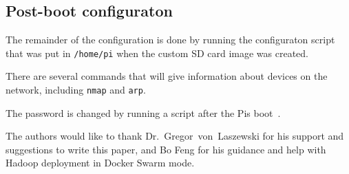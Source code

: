 \subsection{Post-boot configuraton}
The remainder of the configuration is done by running the configuraton
script that was put in \verb|/home/pi| when the custom SD card image
was created.

There are several commands that will give information about devices on
the network, including \verb|nmap| and \verb|arp|.

The password is changed by running a script after the Pis
boot~\cite{hid-sp18-419-so-password}.

\begin{acks}

  The authors would like to thank Dr.~Gregor~von~Laszewski for his
  support and suggestions to write this paper, and Bo Feng for his guidance 
  and help with Hadoop deployment in Docker Swarm mode.

\end{acks}



